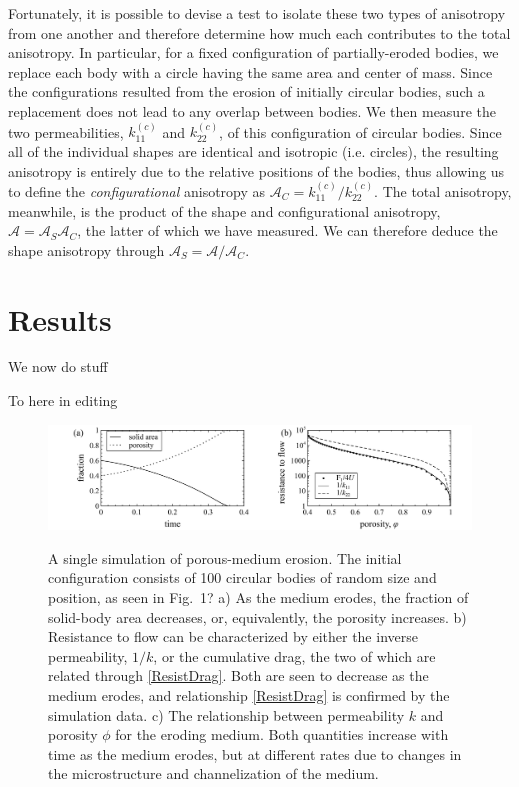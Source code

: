 \documentclass[3p]{elsarticle}
\newcommand{\vsp}[1]{\vspace{#1 pc} \noindent}
\newcommand{\nick}[1]{ {\color{red} #1} }
\newcommand{\anis}{\mathcal{A}}
\begin{document}
	Fortunately, it is possible to devise a test to isolate these two types of anisotropy from one another and therefore determine how much each contributes to the total anisotropy. In particular, for a fixed configuration of partially-eroded bodies, we replace each body with a circle having the same area and center of mass. Since the configurations resulted from the erosion of initially circular bodies, such a replacement does not lead to any overlap between bodies. We then measure the two permeabilities, $k_{11}^{(c)}$ and $ k_{22}^{(c)}$, of this configuration of circular bodies. Since all of the individual shapes are identical and isotropic (i.e. circles), the resulting anisotropy is entirely due to the relative positions of the bodies, thus allowing us to define the {\em configurational} anisotropy as $\anis_C = k_{11}^{(c)} / k_{22}^{(c)}$. The total anisotropy, meanwhile, is the product of the shape and configurational anisotropy, $\anis = \anis_S \anis_C$, the latter of which we have measured. We can therefore deduce the shape anisotropy through $\anis_S = \anis/\anis_C$.

\section{Results}

We now do stuff

\vsp{2} \nick{To here in editing} \vsp{2}



\begin{figure}%
\centering \label{fig2}
\includegraphics[width = 0.99 \textwidth]{./figs/fig2.pdf}
\caption{A single simulation of porous-medium erosion. The initial configuration consists of 100 circular bodies of random size and position, as seen in Fig.~1? a) As the medium erodes, the fraction of solid-body area decreases, or, equivalently, the porosity increases. b) Resistance to flow can be characterized by either the inverse permeability, $1/k$, or the cumulative drag, the two of which are related through \eqref{ResistDrag}. Both are seen to decrease as the medium erodes, and relationship \eqref{ResistDrag} is confirmed by the simulation data.
c) The relationship between permeability $k$ and porosity $\phi$ for the eroding medium. Both quantities increase with time as the medium erodes, but at different rates due to changes in the microstructure and channelization of the medium.
}
\end{figure}
\end{document}
